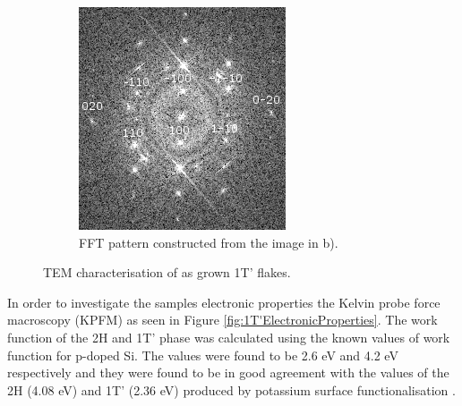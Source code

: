 \begin{figure}[H]
\begin{center}
\begin{subfigure}[b]{0.4\textwidth}
			\includegraphics[width=\textwidth]{1T'/TEMEDFFT.png}
			\caption{FFT pattern constructed from the image in b).}
			\label{fig:1T'TEMEDFET}
		\end{subfigure}
		\caption{TEM characterisation of as grown 1T' flakes.}
		\label{fig:1T'TEMMaps}
	\end{center}
\end{figure}

In order to investigate the samples electronic properties the Kelvin probe force macroscopy (KPFM) as seen in Figure \ref{fig:1T'ElectronicProperties}. The work function of the 2H and 1T' phase was calculated using the known values of work function for p-doped Si. The values were found to be 2.6 eV and 4.2 eV respectively and they were found to be in good agreement with the values of the 2H (4.08 eV) and 1T' (2.36 eV) produced by potassium surface functionalisation \cite{Lei2018}. 

